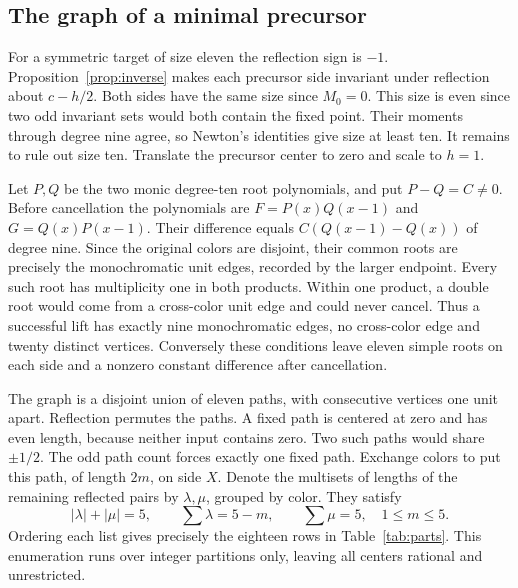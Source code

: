 \subsection{The graph of a minimal precursor}
For a symmetric target of size eleven the reflection sign is \(-1\). Proposition~\ref{prop:inverse} makes each precursor side invariant under reflection about \(c-h/2\). Both sides have the same size since \(M_0=0\). This size is even since two odd invariant sets would both contain the fixed point. Their moments through degree nine agree, so Newton's identities give size at least ten. It remains to rule out size ten. Translate the precursor center to zero and scale to \(h=1\).

Let \(P,Q\) be the two monic degree-ten root polynomials, and put \(P-Q=C\ne0\). Before cancellation the polynomials are \(F=P(x)Q(x-1)\) and \(G=Q(x)P(x-1)\). Their difference equals \(C(Q(x-1)-Q(x))\) of degree nine. Since the original colors are disjoint, their common roots are precisely the monochromatic unit edges, recorded by the larger endpoint. Every such root has multiplicity one in both products. Within one product, a double root would come from a cross-color unit edge and could never cancel. Thus a successful lift has exactly nine monochromatic edges, no cross-color edge and twenty distinct vertices. Conversely these conditions leave eleven simple roots on each side and a nonzero constant difference after cancellation.

The graph is a disjoint union of eleven paths, with consecutive vertices one unit apart. Reflection permutes the paths. A fixed path is centered at zero and has even length, because neither input contains zero. Two such paths would share \(\pm1/2\). The odd path count forces exactly one fixed path. Exchange colors to put this path, of length \(2m\), on side \(X\). Denote the multisets of lengths of the remaining reflected pairs by \(\lambda,\mu\), grouped by color. They satisfy
\begin{equation}\label{eq:parts}
 |\lambda|+|\mu|=5,\qquad \sum\lambda=5-m,\qquad \sum\mu=5,\quad 1\le m\le5 .
\end{equation}
Ordering each list gives precisely the eighteen rows in Table~\ref{tab:parts}. This enumeration runs over integer partitions only, leaving all centers rational and unrestricted.

